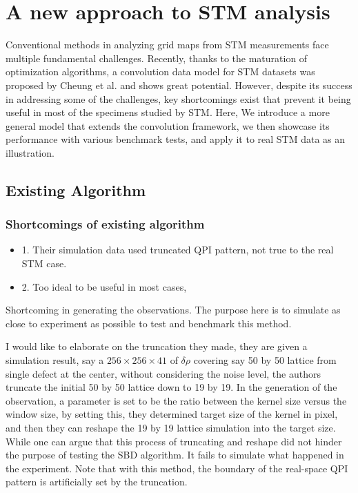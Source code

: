 \chapter{A new approach to STM analysis}
Conventional methods in analyzing grid maps from STM measurements face multiple fundamental  challenges. Recently, thanks to the maturation of optimization algorithms, a convolution data model for STM datasets was proposed by Cheung et al.\cite{cheungDictionaryLearningFouriertransform2020} and shows great potential. However,  despite its success in addressing some of the challenges, key shortcomings exist that prevent it being useful in most of the specimens studied by STM. Here, We introduce a more general model that extends the convolution framework, we then showcase its performance with various benchmark tests, and apply it to real STM data as an illustration.  




\pagebreak


\section{Existing Algorithm}
\subsection{Shortcomings of existing algorithm}
\begin{itemize}
	\item 1. Their simulation data used truncated QPI pattern, not true to the real STM case. 
	\item 2. Too ideal to be useful in most cases,
\end{itemize}

Shortcoming in generating the observations. The purpose here is to simulate as close to experiment as possible to test and benchmark this method. 

I would like to elaborate on the truncation they made, they are given a simulation result, say a $256\times256\times41$ of $\delta\rho$ covering say 50 by 50 lattice from single defect at the center, without considering the noise level, the authors truncate the initial 50 by 50 lattice down to 19 by 19. In the generation of the observation, a parameter is set to be the ratio between the kernel size versus the window size, by setting this, they determined target size of the kernel in pixel, and then they can reshape the 19 by 19 lattice simulation into the target size. While one can argue that this process of truncating and reshape did not hinder the purpose of testing the SBD algorithm. It fails to simulate what happened in the experiment. Note that with this method, the boundary of the real-space QPI pattern is artificially set by the truncation.

